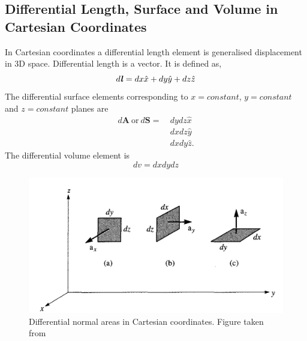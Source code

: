 \documentclass[12pt,a4paper]{article}
\begin{document}
\subsection{Differential Length, Surface and Volume in Cartesian Coordinates}
In Cartesian coordinates a differential length element is generalised displacement in 3D space. Differential length is a vector. It is defined as,
\begin{equation}
d\textbf{\textit{l}}=dx\hat x+dy\hat y+dz\hat z
\end{equation}
The differential surface elements corresponding to $x=constant$, $y=constant$ and $z=constant$ planes are
\begin{equation}
\begin{split}
d\textbf{A}~\mathrm{or}~d\textbf{S}=~&dydz\hat x\\
&dxdz\hat y\\
&dxdy\hat z.
\end{split}
\end{equation}
The differential volume element is
\begin{equation}
dv=dxdydz
\end{equation}
\begin{figure}[H]
\centering
\includegraphics[scale=0.3]{Figure3-2S.png}
\caption{Differential normal areas in Cartesian coordinates. Figure taken from~\cite[Figure 3.2, page 54]{Sadiku}}
\label{Cartesian-differential-area}
\end{figure}
\end{document}
